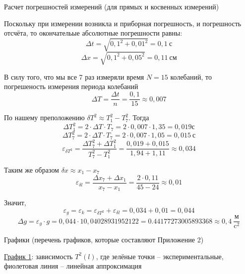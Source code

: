 \documentclass[12pt]{article}
\begin{document}
    \begin{point}{Расчет погрешностей измерений (для прямых и косвенных измерений)}
        \par Поскольку при измерении возникла и приборная погрешность, и погрешность отсчёта, то окончательые абсолютные погрешности равны:
        \[ \Delta t = \sqrt{0,1^2 + 0,01^2} = 0,1 \ \text{с} \]
        \[ \Delta x = \sqrt{0,1^2 + 0,05^2} = 0,11 \ \text{см} \]

        \par В силу того, что мы все 7 раз измеряли время $N = 15$ колебаний, то погрешеность измерения периода колебаний 
        \[ \Delta T = \frac{\Delta t}{n} = \frac{0,1}{15} \approx 0,007\]

        \par По нашему преположению $\delta T^2 \approx T_1^2 - T_7^2$. Тогда 
        \[  \Delta T_1^2 = 2 \cdot \Delta T \cdot T_7 = 2 \cdot 0,007 \cdot 1,35 = 0,019 \text{с} \]
        \[  \Delta T_7^2 = 2 \cdot \Delta T \cdot T_7 = 2 \cdot 0,007 \cdot 1,05 = 0,015 \ \text{с} \]
        \[ \varepsilon_{\delta T^2} = \frac{\Delta T_7^2 + \Delta T_1^2}{T_7^2 - T_1^2} = \frac{0,019 + 0,015}{1,94 + 1,11} \approx 0,034 \]

         \par Таким же образом $\delta x \approx x_1 - x_7$
         \[ \varepsilon_{\delta l} = \frac{\Delta x_7 + \Delta x_1}{x_7 - x_1} = \frac{2 \cdot 0,11}{45 - 24} \approx 0,01\]

         \par Значит,
         \[ \varepsilon_g = \varepsilon_k = \varepsilon_{\delta T^2} + \varepsilon_{\delta l} = 0,034 + 0,01 = 0,044\]
         \[ \Delta g = \varepsilon_g \cdot g = 0,044 \cdot 10,04028931952122 = 0.44177273005893368 \approx 0,4 \ \frac{\text{м}}{\text{c}^2} \]
        
    \end{point}
    
    \begin{point}{Графики (перечень графиков, которые составляют Приложение 2)}
        \begin{center}
        \end{center}
        \begin{center}
            \underline{График 1}: зависимость $T^2(l)$, где зелёные точки -- экспериментальные, фиолетовая линия -- линейная аппроксимация
        \end{center}
    \end{point}
    
\end{document}
